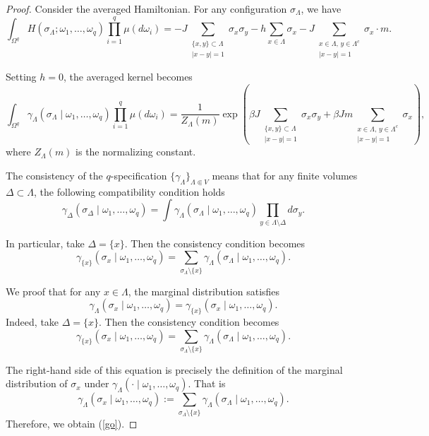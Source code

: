 \documentclass[11pt,reqno]{amsart}
\numberwithin{equation}{section} \setcounter{tocdepth}{1}
\begin{document}
\begin{proof}
Consider the averaged Hamiltonian. For any configuration $\sigma_\Lambda$, we have
$$
\int_{\Omega^q} H(\sigma_\Lambda; \omega_1, \dots, \omega_q) \prod_{i=1}^q \mu(d\omega_i) = -J \sum_{\substack{\{x,y\} \subset \Lambda \\ |x-y|=1}} \sigma_x \sigma_y - h \sum_{x \in \Lambda} \sigma_x - J \sum_{\substack{x \in \Lambda,\, y \in \Lambda^c \\ |x-y|=1}} \sigma_x \cdot m.
$$

Setting $h = 0$, the averaged kernel becomes
$$
\int_{\Omega^q} \gamma_\Lambda(\sigma_\Lambda \mid \omega_1, \dots, \omega_q) \prod_{i=1}^q \mu(d\omega_i) = \frac{1}{Z_\Lambda(m)} \exp\left( \beta J \sum_{\substack{\{x,y\} \subset \Lambda \\ |x-y|=1}} \sigma_x \sigma_y + \beta J m \sum_{\substack{x \in \Lambda,\, y \in \Lambda^c \\ |x-y|=1}} \sigma_x \right),
$$
where $Z_\Lambda(m)$ is the normalizing constant.

The consistency of the $q$-specification $\{\gamma_\Lambda\}_{\Lambda \Subset V}$ means that for any finite volumes $\Delta \subset \Lambda$, the following compatibility condition holds
$$
\gamma_\Delta(\sigma_\Delta \mid \omega_1, \dots, \omega_q) = \int \gamma_\Lambda(\sigma_\Lambda \mid \omega_1, \dots, \omega_q) \prod_{y \in \Lambda \setminus \Delta} d\sigma_y.
$$

In particular, take $\Delta = \{x\}$. Then the consistency condition becomes
$$
\gamma_{\{x\}}(\sigma_x \mid \omega_1, \dots, \omega_q) = \sum_{\sigma_\Lambda \setminus \{x\}} \gamma_\Lambda(\sigma_\Lambda \mid \omega_1, \dots, \omega_q).
$$

We proof that for any $x \in \Lambda$, the marginal distribution satisfies
\begin{equation}\label{go}
\gamma_\Lambda(\sigma_x \mid \omega_1, \dots, \omega_q) = \gamma_{\{x\}}(\sigma_x \mid \omega_1, \dots, \omega_q).
\end{equation}
Indeed,  take $\Delta = \{x\}$. Then the consistency condition becomes
$$
\gamma_{\{x\}}(\sigma_x \mid \omega_1, \dots, \omega_q) = \sum_{\sigma_\Lambda \setminus \{x\}} \gamma_\Lambda(\sigma_\Lambda \mid \omega_1, \dots, \omega_q).
$$

The right-hand side of this equation is precisely the definition of the marginal distribution of $\sigma_x$ under $\gamma_\Lambda(\cdot \mid \omega_1, \dots, \omega_q)$. That is
$$
\gamma_\Lambda(\sigma_x \mid \omega_1, \dots, \omega_q) := \sum_{\sigma_\Lambda \setminus \{x\}} \gamma_\Lambda(\sigma_\Lambda \mid \omega_1, \dots, \omega_q).
$$ Therefore, we obtain (\ref{go}).


\end{proof}
\end{document}

